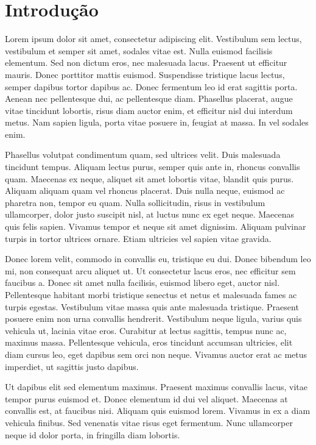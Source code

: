 \newpage

\chapter{Introdução}

Lorem ipsum dolor sit amet, consectetur adipiscing elit. Vestibulum sem lectus, vestibulum et semper sit amet, sodales vitae est. Nulla euismod facilisis elementum. Sed non dictum eros, nec malesuada lacus. Praesent ut efficitur mauris. Donec porttitor mattis euismod. Suspendisse tristique lacus lectus, semper dapibus tortor dapibus ac. Donec fermentum leo id erat sagittis porta. Aenean nec pellentesque dui, ac pellentesque diam. Phasellus placerat, augue vitae tincidunt lobortis, risus diam auctor enim, et efficitur nisl dui interdum metus. Nam sapien ligula, porta vitae posuere in, feugiat at massa. In vel sodales enim.

Phasellus volutpat condimentum quam, sed ultrices velit. Duis malesuada tincidunt tempus. Aliquam lectus purus, semper quis ante in, rhoncus convallis quam. Maecenas ex neque, aliquet sit amet lobortis vitae, blandit quis purus. Aliquam aliquam quam vel rhoncus placerat. Duis nulla neque, euismod ac pharetra non, tempor eu quam. Nulla sollicitudin, risus in vestibulum ullamcorper, dolor justo suscipit nisl, at luctus nunc ex eget neque. Maecenas quis felis sapien. Vivamus tempor et neque sit amet dignissim. Aliquam pulvinar turpis in tortor ultrices ornare. Etiam ultricies vel sapien vitae gravida.

Donec lorem velit, commodo in convallis eu, tristique eu dui. Donec bibendum leo mi, non consequat arcu aliquet ut. Ut consectetur lacus eros, nec efficitur sem faucibus a. Donec sit amet nulla facilisis, euismod libero eget, auctor nisl. Pellentesque habitant morbi tristique senectus et netus et malesuada fames ac turpis egestas. Vestibulum vitae massa quis ante malesuada tristique. Praesent posuere enim non urna convallis hendrerit. Vestibulum neque ligula, varius quis vehicula ut, lacinia vitae eros. Curabitur at lectus sagittis, tempus nunc ac, maximus massa. Pellentesque vehicula, eros tincidunt accumsan ultricies, elit diam cursus leo, eget dapibus sem orci non neque. Vivamus auctor erat ac metus imperdiet, ut sagittis justo dapibus.

Ut dapibus elit sed elementum maximus. Praesent maximus convallis lacus, vitae tempor purus euismod et. Donec elementum id dui vel aliquet. Maecenas at convallis est, at faucibus nisi. Aliquam quis euismod lorem. Vivamus in ex a diam vehicula finibus. Sed venenatis vitae risus eget fermentum. Nunc ullamcorper neque id dolor porta, in fringilla diam lobortis.


